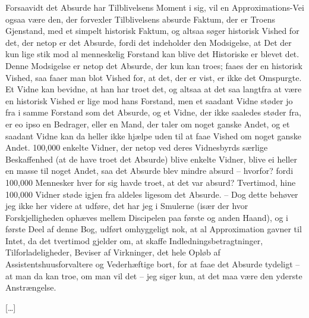 \documentclass[12pt,a4paper]{article}
\begin{document}
Forsaavidt det Absurde har Tilblivelsens Moment i sig, vil en Approximations-Vei ogsaa være den, der forvexler Tilblivelsens absurde Faktum, der er Troens Gjenstand, med et simpelt historisk Faktum, og altsaa søger historisk Vished for det, der netop er det Absurde, fordi det indeholder den Modsigelse, at Det der kun lige stik mod al menneskelig Forstand kan blive det Historiske er blevet det. Denne Modsigelse er netop det Absurde, der kun kan troes; faaes der en historisk Vished, saa faaer man blot Vished for, at det, der er vist, er ikke det Omspurgte. Et Vidne kan bevidne, at han har troet det, og altsaa at det saa langtfra at være en historisk Vished er lige mod hans Forstand, men et saadant Vidne støder jo fra i samme Forstand som det Absurde, og et Vidne, der ikke saaledes støder fra, er eo ipso en Bedrager, eller en Mand, der taler om noget ganske Andet, og et saadant Vidne kan da heller ikke hjælpe uden til at faae Vished om noget ganske Andet. 100,000 enkelte Vidner, der netop ved deres Vidnesbyrds særlige Beskaffenhed (at de have troet det Absurde) blive enkelte Vidner, blive ei heller en masse til noget Andet, saa det Absurde blev mindre absurd – hvorfor? fordi 100,000 Mennesker hver for sig havde troet, at det var absurd? Tvertimod, hine 100,000 Vidner støde igjen fra aldeles ligesom det Absurde. – Dog dette behøver jeg ikke her videre at udføre, det har jeg i Smulerne (især der hvor Forskjelligheden ophæves mellem Discipelen paa første og anden Haand), og i første Deel af denne Bog, udført omhyggeligt nok, at al Approximation gavner til Intet, da det tvertimod gjelder om, at skaffe Indledningsbetragtninger, Tilforladeligheder, Beviser af Virkninger, det hele Opløb af Assistentshuusforvaltere og Vederhæftige bort, for at faae det Absurde tydeligt – at man da kan troe, om man vil det – jeg siger kun, at det maa være den yderste Anstrængelse.

[…]
\end{document}
